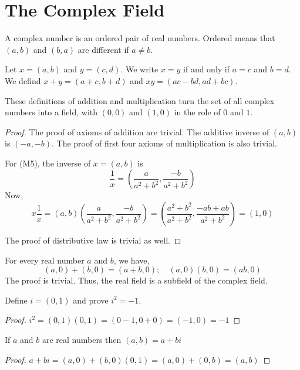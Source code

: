 \pagebreak

\section{The Complex Field}

\begin{defn}
    A complex number is an ordered pair of real numbers.
    Ordered means that $(a, b)$ and $(b, a)$ are different if $a \neq b$.

    Let $x = (a, b)$ and $y = (c, d)$. We write $x = y$ if and only if $a = c$ and $b = d$.
    We defind $x + y = (a + c, b + d)$ and $xy = (ac - bd, ad + bc)$.
\end{defn}

\begin{thm}
    These definitions of addition and multiplication turn the set of all complex numbers into a field,
    with $(0, 0)$ and $(1, 0)$ in the role of $0$ and $1$.
    \begin{proof}
        The proof of axioms of addition are trivial. The additive inverse of $(a, b)$ is $(-a, -b)$.
        The proof of first four axioms of multiplication is also trivial.
        
        For (M5), the inverse of $x = (a, b)$ is $$ \frac{1}{x} = \left( \frac{a}{a^2 + b^2}, \frac{-b}{a^2 + b^2} \right) $$
        Now, $$ x \frac{1}{x} = (a, b) \left( \frac{a}{a^2 + b^2}, \frac{-b}{a^2 + b^2} \right) 
                    = \left( \frac{a^2 + b^2}{a^2 + b^2}, \frac{-ab + ab}{a^2 + b^2} \right) = (1, 0) $$

        The proof of distributive law is trivial as well.
    \end{proof}
\end{thm}

\begin{thm}
    For every real number $a$ and $b$, we have,
    $$ (a, 0) + (b, 0) = (a + b, 0) ; \quad (a, 0) (b, 0) = (ab, 0) $$
    The proof is trivial. Thus, the real field is a subfield of the complex field.
\end{thm}

\begin{thm}
    Define $i = (0, 1)$ and prove $i^2 = -1$.
    \begin{proof}
        $i^2 = (0, 1) (0, 1) = (0 - 1, 0 + 0) = (-1, 0) = -1$
    \end{proof}
\end{thm}

\begin{thm}
    If $a$ and $b$ are real numbers then $(a, b) = a + bi$
    \begin{proof}
        $a + bi = (a, 0) + (b, 0)(0, 1) = (a, 0) + (0, b) = (a, b)$
    \end{proof}
\end{thm}

